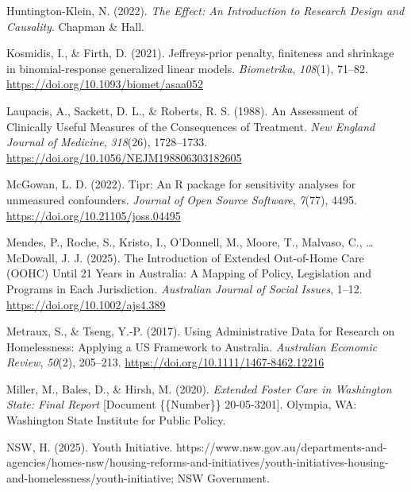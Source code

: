 \documentclass[
  jou,
  floatsintext,
  longtable,
  nolmodern,
  notxfonts,
  notimes,
  colorlinks=true,linkcolor=blue,citecolor=blue,urlcolor=blue]{apa7}
\newlength{\cslhangindent}
\newenvironment{CSLReferences}[2] %
 {\begin{list}{}{%
  \setlength{\itemindent}{0pt}
  \setlength{\leftmargin}{0pt}
  \setlength{\parsep}{0pt}
  \ifodd #1
   \setlength{\leftmargin}{\cslhangindent}
   \setlength{\itemindent}{-1\cslhangindent}
  \fi
  \setlength{\itemsep}{#2\baselineskip}}}
 {\end{list}}
\begin{document}
\begin{CSLReferences}{1}{0}
Huntington-Klein, N. (2022). \emph{The {Effect}: {An Introduction} to
{Research Design} and {Causality}}. Chapman \& Hall.

Kosmidis, I., \& Firth, D. (2021). Jeffreys-prior penalty, finiteness
and shrinkage in binomial-response generalized linear models.
\emph{Biometrika}, \emph{108}(1), 71--82.
\url{https://doi.org/10.1093/biomet/asaa052}

Laupacis, A., Sackett, D. L., \& Roberts, R. S. (1988). An {Assessment}
of {Clinically Useful Measures} of the {Consequences} of {Treatment}.
\emph{New England Journal of Medicine}, \emph{318}(26), 1728--1733.
\url{https://doi.org/10.1056/NEJM198806303182605}

McGowan, L. D. (2022). Tipr: {An R} package for sensitivity analyses for
unmeasured confounders. \emph{Journal of Open Source Software},
\emph{7}(77), 4495. \url{https://doi.org/10.21105/joss.04495}

Mendes, P., Roche, S., Kristo, I., O'Donnell, M., Moore, T., Malvaso,
C., \ldots{} McDowall, J. J. (2025). The {Introduction} of {Extended
Out-of-Home Care} ({OOHC}) {Until} 21 {Years} in {Australia}: {A
Mapping} of {Policy}, {Legislation} and {Programs} in {Each
Jurisdiction}. \emph{Australian Journal of Social Issues}, 1--12.
\url{https://doi.org/10.1002/ajs4.389}

Metraux, S., \& Tseng, Y.-P. (2017). Using {Administrative Data} for
{Research} on {Homelessness}: {Applying} a {US Framework} to
{Australia}. \emph{Australian Economic Review}, \emph{50}(2), 205--213.
\url{https://doi.org/10.1111/1467-8462.12216}

Miller, M., Bales, D., \& Hirsh, M. (2020). \emph{Extended {Foster Care}
in {Washington State}: {Final Report}} {[}Document \{\{Number\}\}
20-05-3201{]}. Olympia, WA: Washington State Institute for Public
Policy.

NSW, H. (2025). Youth {Initiative}.
https://www.nsw.gov.au/departments-and-agencies/homes-nsw/housing-reforms-and-initiatives/youth-initiatives-housing-and-homelessness/youth-initiative;
NSW Government.


\end{CSLReferences}
\end{document}
